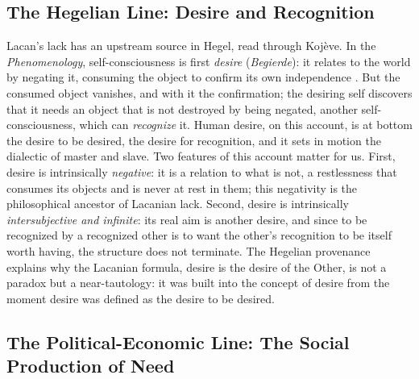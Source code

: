 \subsection{The Hegelian Line: Desire and Recognition}

Lacan's lack has an upstream source in Hegel, read through Kojève. In the \emph{Phenomenology}, self-consciousness is first \emph{desire} (\textit{Begierde}): it relates to the world by negating it, consuming the object to confirm its own independence \parencite{hegel1807phenomenology}. But the consumed object vanishes, and with it the confirmation; the desiring self discovers that it needs an object that is not destroyed by being negated, another self-consciousness, which can \emph{recognize} it. Human desire, on this account, is at bottom the desire to be desired, the desire for recognition, and it sets in motion the dialectic of master and slave. Two features of this account matter for us. First, desire is intrinsically \emph{negative}: it is a relation to what is not, a restlessness that consumes its objects and is never at rest in them; this negativity is the philosophical ancestor of Lacanian lack. Second, desire is intrinsically \emph{intersubjective and infinite}: its real aim is another desire, and since to be recognized by a recognized other is to want the other's recognition to be itself worth having, the structure does not terminate. The Hegelian provenance explains why the Lacanian formula, desire is the desire of the Other, is not a paradox but a near-tautology: it was built into the concept of desire from the moment desire was defined as the desire to be desired.

\subsection{The Political-Economic Line: The Social Production of Need}

